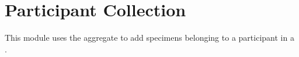 \chapter{Participant Collection}

This module uses the  aggregate to add specimens
belonging to a participant in a .
